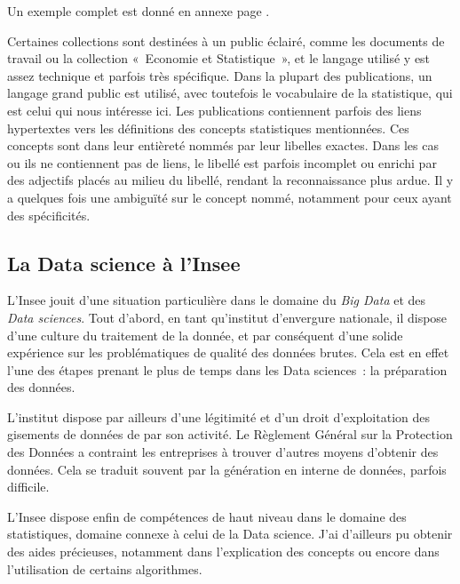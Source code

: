 Un exemple complet est donné en annexe page \pageref{publication-xml}.
\newline

Certaines collections sont destinées à un public éclairé, comme les documents de travail ou la collection «~Economie et Statistique~», et le langage utilisé y est assez technique et parfois très spécifique. Dans la plupart des publications, un langage grand public est utilisé, avec toutefois le vocabulaire de la statistique, qui est celui qui nous intéresse ici. Les publications contiennent parfois des liens hypertextes vers les définitions des concepts statistiques mentionnées. Ces concepts sont dans leur entièreté nommés par leur libelles exactes. Dans les cas ou ils ne contiennent pas de liens, le libellé est parfois incomplet ou enrichi par des adjectifs placés au milieu du libellé, rendant la reconnaissance plus ardue. Il y a quelques fois une ambiguïté sur le concept nommé, notamment pour ceux ayant des spécificités.
\label{section 1.2.2}


\subsection{La Data science à l'Insee}

L'Insee jouit d'une situation particulière dans le domaine du \textit{Big Data} et des \textit{Data sciences}. Tout d'abord, en tant qu'institut d'envergure nationale, il dispose d'une culture du traitement de la donnée, et par conséquent d'une solide expérience sur les problématiques de qualité des données brutes. Cela est en effet l'une des étapes prenant le plus de temps dans les Data sciences~: la préparation des données.
\newline

L'institut dispose par ailleurs d'une légitimité et d'un droit d'exploitation des gisements de données de par son activité. Le Règlement Général sur la Protection des Données a contraint les entreprises à trouver d'autres moyens d'obtenir des données. Cela se traduit souvent par la génération en interne de données, parfois difficile.
\newline

L'Insee dispose enfin de compétences de haut niveau dans le domaine des statistiques, domaine connexe à celui de la Data science. J'ai d'ailleurs pu obtenir des aides précieuses, notamment dans l'explication des concepts ou encore dans l'utilisation de certains algorithmes.
\newline

